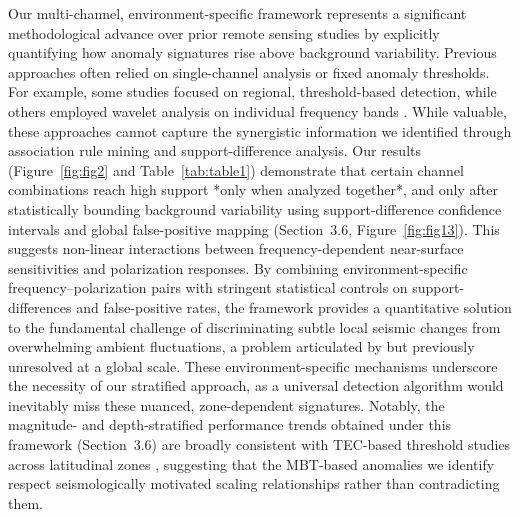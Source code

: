 \documentclass[preprint,review,12pt,authoryear]{elsarticle}
\begin{document}
Our multi-channel, environment-specific framework represents a significant methodological advance over prior remote sensing studies by explicitly quantifying how anomaly signatures rise above background variability. Previous approaches often relied on single-channel analysis or fixed anomaly thresholds. For example, some studies focused on regional, threshold-based detection, while others employed wavelet analysis on individual frequency bands \citep{liuPreearthquakeMBTAnomalies2023,wuIdentifyingSeismicAnomalies2024}. While valuable, these approaches cannot capture the synergistic information we identified through association rule mining and support-difference analysis. Our results (Figure~\ref{fig:fig2} and Table~\ref{tab:table1}) demonstrate that certain channel combinations reach high support *only when analyzed together*, and only after statistically bounding background variability using support-difference confidence intervals and global false-positive mapping (Section~3.6, Figure~\ref{fig:fig13}). This suggests non-linear interactions between frequency-dependent near-surface sensitivities and polarization responses. By combining environment-specific frequency--polarization pairs with stringent statistical controls on support-differences and false-positive rates, the framework provides a quantitative solution to the fundamental challenge of discriminating subtle local seismic changes from overwhelming ambient fluctuations, a problem articulated by \citet{maedaDiscriminationLocalFaint2008} but previously unresolved at a global scale. These environment-specific mechanisms underscore the necessity of our stratified approach, as a universal detection algorithm would inevitably miss these nuanced, zone-dependent signatures. Notably, the magnitude- and depth-stratified performance trends obtained under this framework (Section~3.6) are broadly consistent with TEC-based threshold studies across latitudinal zones \citep{shahTotalElectronContent2020}, suggesting that the MBT-based anomalies we identify respect seismologically motivated scaling relationships rather than contradicting them.
\end{document}
